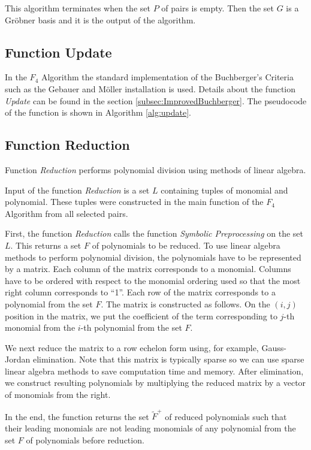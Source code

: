 This algorithm terminates when the set $P$ of pairs is empty. Then the set $G$ is a Gr\"obner basis and it is the output of the algorithm.



\subsection{Function Update}
In the $F_4$ Algorithm the standard implementation of the Buchberger's Criteria such as the Gebauer and M\"oller installation \cite{Gebauer-Moller88} is used. Details about the function \textit{Update} can be found in the section \ref{subsec:ImprovedBuchberger}. The pseudocode of the function is shown in Algorithm \ref{alg:update}.

\subsection{Function Reduction}
Function \textit{Reduction} performs polynomial division using methods of linear algebra.

Input of the function \textit{Reduction} is a set $L$ containing tuples of monomial and polynomial. These tuples were constructed in the main function of the $F_4$ Algorithm from all selected pairs.

First, the function \textit{Reduction} calls the function \textit{Symbolic Preprocessing} on the set $L$. This returns a set $F$ of polynomials to be reduced. To use linear algebra methods to perform polynomial division, the polynomials have to be represented by a matrix. Each column of the matrix corresponds to a monomial. Columns have to be ordered with respect to the monomial ordering used so that the most right column corresponds to ``1''. Each row of the matrix corresponds to a polynomial from the set $F$. The matrix is constructed as follows. On the $(i, j)$ position in the matrix, we put the coefficient of the term corresponding to $j$-th monomial from the $i$-th polynomial from the set $F$.

We next reduce the matrix to a row echelon form using, for example, Gauss-Jordan elimination. Note that this matrix is typically sparse so we can use sparse linear algebra methods to save computation time and memory. After elimination, we construct resulting polynomials by multiplying the reduced matrix by a vector of monomials from the right.

In the end, the function returns the set $\tilde{F}^+$ of reduced polynomials such that their leading monomials are not leading monomials of any polynomial from the set $F$ of polynomials before reduction.

